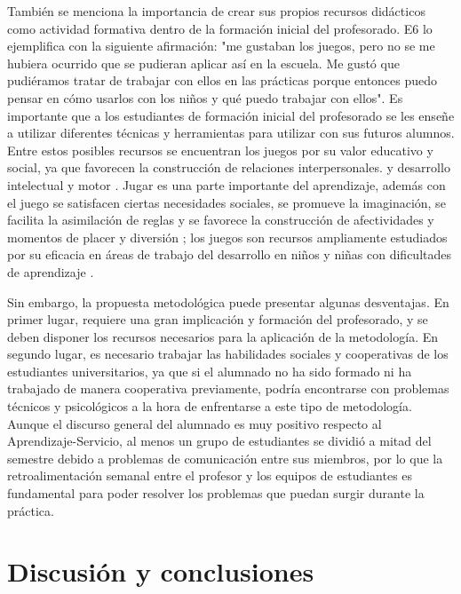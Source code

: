 \documentclass[spanish]{textolivre}
\begin{document}
También se menciona la importancia de crear sus propios recursos didácticos como actividad formativa dentro de la formación inicial del profesorado. E6 lo ejemplifica con la siguiente afirmación:  "me gustaban los juegos, pero no se me hubiera ocurrido que se pudieran aplicar así en la escuela. Me gustó que pudiéramos tratar de trabajar con ellos en las prácticas porque entonces puedo pensar en cómo usarlos con los niños y qué puedo trabajar con ellos". Es importante que a los estudiantes de formación inicial del profesorado se les enseñe a utilizar diferentes técnicas y herramientas para utilizar con sus futuros alumnos. Entre estos posibles recursos se encuentran los juegos por su valor educativo y social, ya que favorecen la construcción de relaciones interpersonales. \cite{turkoglu_effect_2019} y desarrollo intelectual y motor \cite{sala_video_2018,gumusdag_effects_2019}. Jugar es una parte importante del aprendizaje, además con el juego se satisfacen ciertas necesidades sociales, se promueve la imaginación, se facilita la asimilación de reglas y se favorece la construcción de afectividades y momentos de placer y diversión \cite{vygotskii_desarrollo_1982}; los juegos son recursos ampliamente estudiados por su eficacia en áreas de trabajo del desarrollo en niños y niñas con dificultades de aprendizaje \cite{kokkalia_role_2016,hanghoj_can_2018,jimenez_porta__impacto_2018,manzano-leon_testing_2021}.

Sin embargo, la propuesta metodológica puede presentar algunas desventajas. En primer lugar, requiere una gran implicación y formación del profesorado, y se deben disponer los recursos necesarios para la aplicación de la metodología. En segundo lugar, es necesario trabajar las habilidades sociales y cooperativas de los estudiantes universitarios, ya que si el alumnado no ha sido formado ni ha trabajado de manera cooperativa previamente, podría encontrarse con problemas técnicos y psicológicos a la hora de enfrentarse a este tipo de metodología. Aunque el discurso general del alumnado es muy positivo respecto al Aprendizaje-Servicio, al menos un grupo de estudiantes se dividió a mitad del semestre debido a problemas de comunicación entre sus miembros, por lo que la retroalimentación semanal entre el profesor y los equipos de estudiantes es fundamental para poder resolver los problemas que puedan surgir durante la práctica.

\section{Discusión y conclusiones}
\end{document}
